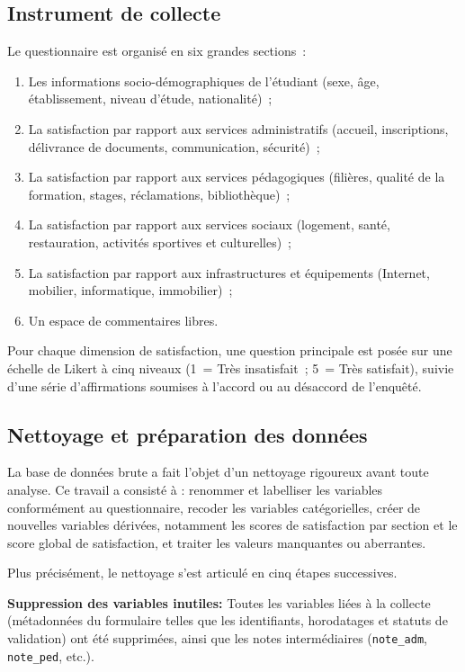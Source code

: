 \documentclass[
12pt,          %
a4paper,       %
oneside,      %
openright      %
]{report}          %
\begin{document}
		\subsection{Instrument de collecte}
		
		Le questionnaire est organisé en six grandes sections~:
		
		\begin{enumerate}
			\item Les informations socio-démographiques de l'étudiant (sexe, âge, établissement,
			niveau d'étude, nationalité)~;
			\item La satisfaction par rapport aux services administratifs (accueil, inscriptions,
			délivrance de documents, communication, sécurité)~;
			\item La satisfaction par rapport aux services pédagogiques (filières, qualité de la
			formation, stages, réclamations, bibliothèque)~;
			\item La satisfaction par rapport aux services sociaux (logement, santé, restauration,
			activités sportives et culturelles)~;
			\item La satisfaction par rapport aux infrastructures et équipements (Internet, mobilier,
			informatique, immobilier)~;
			\item Un espace de commentaires libres.
		\end{enumerate}
		
		Pour chaque dimension de satisfaction, une question principale est posée sur une échelle
		de Likert à cinq niveaux (1~= Très insatisfait~; 5~= Très satisfait), suivie d'une série
		d'affirmations soumises à l'accord ou au désaccord de l'enquêté.
		
		\subsection{Nettoyage et préparation des données}
		
		La base de données brute a fait l'objet d'un nettoyage rigoureux avant toute
		analyse. Ce travail a consisté à : renommer et labelliser les variables conformément au
		questionnaire, recoder les variables catégorielles, créer de nouvelles variables dérivées,
		notamment les scores de satisfaction par section et le score global de satisfaction,
		et traiter les valeurs manquantes ou aberrantes.
		
		Plus précisément, le nettoyage s'est articulé en cinq étapes successives.
		
		\textbf{Suppression des variables inutiles:}
		Toutes les variables liées à la collecte (métadonnées du formulaire telles
		que les identifiants, horodatages et statuts de validation) ont été supprimées, ainsi
		que les notes intermédiaires (\texttt{note\_adm}, \texttt{note\_ped}, etc.).
		
\end{document}
